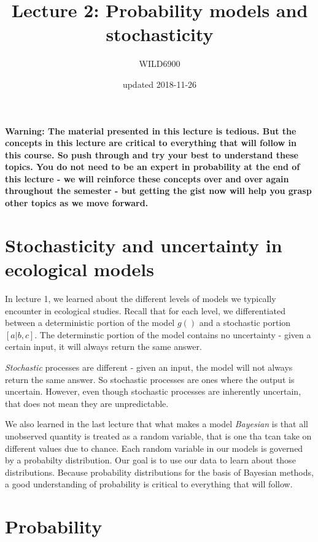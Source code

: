 \documentclass[]{article}
\title{Lecture 2: Probability models and stochasticity}
\subtitle{WILD6900}
\author{}
\date{updated 2018-11-26}
\begin{document}
\maketitle

\textbf{Warning: The material presented in this lecture is tedious. But
the concepts in this lecture are critical to everything that will follow
in this course. So push through and try your best to understand these
topics. You do not need to be an expert in probability at the end of
this lecture - we will reinforce these concepts over and over again
throughout the semester - but getting the gist now will help you grasp
other topics as we move forward.}

\hypertarget{stochasticity-and-uncertainty-in-ecological-models}{%
\section{Stochasticity and uncertainty in ecological
models}\label{stochasticity-and-uncertainty-in-ecological-models}}

In lecture 1, we learned about the different levels of models we
typically encounter in ecological studies. Recall that for each level,
we differentiated between a deterministic portion of the model \(g()\)
and a stochastic portion \([a|b,c]\). The determinstic portion of the
model contains no uncertainty - given a certain input, it will always
return the same answer.

\emph{Stochastic} processes are different - given an input, the model
will not always return the same answer. So stochastic processes are ones
where the output is uncertain. However, even though stochastic processes
are inherently uncertain, that does not mean they are unpredictable.

We also learned in the last lecture that what makes a model
\emph{Bayesian} is that all unobserved quantity is treated as a random
variable, that is one tha tcan take on different values due to chance.
Each random variable in our models is governed by a probabilty
distribution. Our goal is to use our data to learn about those
distributions. Because probability distributions for the basis of
Bayesian methods, a good understanding of probability is critical to
everything that will follow.

\hypertarget{probability}{%
\section{Probability}\label{probability}}
\end{document}
